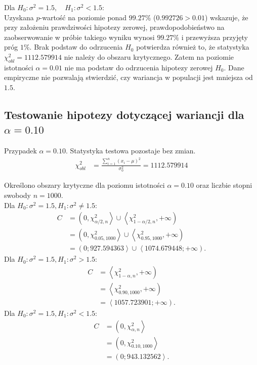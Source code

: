 \documentclass[12pt, a4paper]{article}
\begin{document}
	\noindent Dla $H_0 : \sigma^2 = 1.5, \quad H_1 : \sigma^2 < 1.5$: \\
		Uzyskana $p$-wartość na poziomie ponad $99.27\%$ ($0.992726 > 0.01$) wskazuje, że przy założeniu prawdziwości hipotezy zerowej, prawdopodobieństwo na zaobserwowanie w próbie takiego wyniku wynosi $99.27\%$ i przewyższa przyjęty próg $1\%$. Brak podstaw do odrzucenia $H_0$ potwierdza również to, że statystyka $\chi^2_{obl} = 1112.579914$ nie należy do obszaru krytycznego. Zatem na poziomie istotności $\alpha = 0.01$ nie ma podstaw do odrzucenia hipotezy zerowej $H_0$. Dane empiryczne nie pozwalają stwierdzić, czy wariancja w populacji jest mniejsza od $1.5$.\\
	
	
	\subsection{Testowanie hipotezy dotyczącej wariancji dla $\alpha =0.10$}	
	Przypadek $\alpha =0.10$. Statystyka testowa pozostaje bez zmian.\\
	\[
	\begin{aligned}
		\chi^2_{obl}
		&= \frac{\sum_{i=1}^{n}(x_i-\mu)^2}{\sigma_0^2}= 1112.579914
	\end{aligned}
	\]
	
		Określono obszary krytyczne dla poziomu istotności $\alpha =0.10$ oraz liczbie stopni swobody $n=1000$.\\
	Dla $H_0:\sigma^2=1.5, H_1:\sigma^2\neq1.5$:\\
	\begin{align*}
		C &= \left(0, \chi^2_{\alpha/2, n}\right\rangle \cup \left\langle \chi^2_{1-\alpha/2, n}, +\infty\right) \\
		&= \left(0, \chi^2_{0.05, 1000}\right\rangle \cup \left\langle \chi^2_{0.95, 1000}, +\infty\right) \\
		&= \left(0; 927.594363\right\rangle \cup \left\langle 1074.679448; +\infty\right).
	\end{align*}
	Dla $H_0:\sigma^2=1.5, H_1:\sigma^2>1.5$:\\
	\begin{align*}
		C &= \left\langle \chi^2_{1-\alpha, n}, +\infty\right) \\
		&= \left\langle \chi^2_{0.90, 1000}, +\infty\right) \\
		&= \left\langle 1057.723901; +\infty\right).
	\end{align*}
	Dla $H_0:\sigma^2=1.5, H_1:\sigma^2<1.5$:\\
	\begin{align*}
		C &= \left(0, \chi^2_{\alpha, n}\right\rangle \\
		&= \left(0, \chi^2_{0.10, 1000}\right\rangle \\
		&= \left(0;943.132562\right\rangle.
	\end{align*}
	
\end{document}
